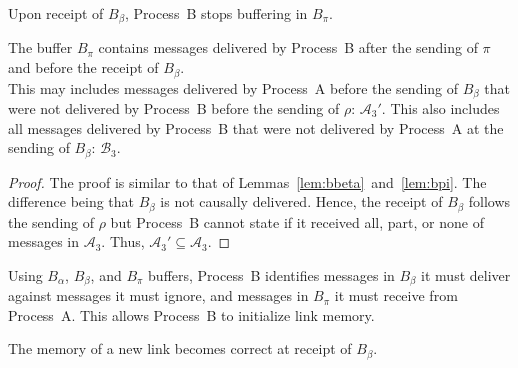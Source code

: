 \noindent Upon receipt of $B_\beta$, Process~B stops buffering in $B_\pi$.
  
\begin{lemma}
  The buffer $B_\pi$ contains messages delivered by Process~B after the
  sending of $\pi$ and before the receipt of $B_\beta$.\\
  This may includes messages delivered by Process~A before the sending of
  $B_\beta$ that were not delivered by Process~B before the sending of $\rho$:
  $\mathcal{A}_3'$. This also includes all messages delivered by Process~B that
  were not delivered by Process~A at the sending of $B_\beta$:
  $\mathcal{B}_3$. 
\end{lemma}

\begin{proof}
  The proof is similar to that of Lemmas~\ref{lem:bbeta}~and~\ref{lem:bpi}. The
  difference being that $B_\beta$ is not causally delivered. Hence, the receipt
  of $B_\beta$ follows the sending of $\rho$ but Process~B cannot state if it
  received all, part, or none of messages in $\mathcal{A}_3$. Thus,
  $\mathcal{A}_3' \subseteq \mathcal{A}_3$.
\end{proof}

\noindent Using $B_\alpha$, $B_\beta$, and $B_\pi$ buffers, Process~B identifies
messages in $B_\beta$ it must deliver against messages it must ignore, and
messages in $B_\pi$ it must receive from Process~A. This allows Process~B to
initialize link memory.

\begin{theorem}
  The memory of a new link becomes correct at receipt of $B_\beta$.
\end{theorem}

